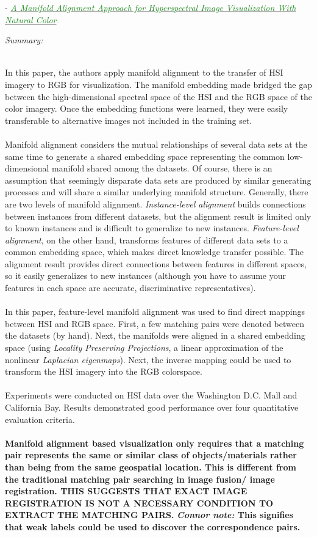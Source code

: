\documentclass[]{article}
\newcommand{\paperentry}[4]{
            \hangindent=1cm
            \textcolor{red}{\cite{#1}} - \href{run:../References/#3}{\textcolor{ForestGreen}{\textit{#2}}}
            
            \noindent            
            \begin{minipage}[t]{0.1\linewidth}\hfill\end{minipage}
            \begin{minipage}[t]{0.8\linewidth}\textcolor{NavyBlue}{{\textit{Summary:}}}#4\end{minipage}
            \vspace{.25cm}
          }
\begin{document}
				
		\paperentry{Liao2016ManAlignmentHSI}
		{A Manifold Alignment Approach for Hyperspectral Image Visualization With Natural Color}
		{Manifold_Representation_Learning/Alignment/Liao2016ManAlignmentHSI.pdf}
		{}\\
		In this paper, the authors apply manifold alignment to the transfer of HSI imagery to RGB for visualization.  The manifold embedding made bridged the gap between the high-dimensional spectral space of the HSI and the RGB space of the color imagery.  Once the embedding functions were learned, they were easily transferable to alternative images not included in the training set. 
		\\ \\
		Manifold alignment considers the mutual relationships of several data sets at the same time to generate a shared embedding space representing the common low-dimensional manifold shared among the datasets.  Of course, there is an assumption that seemingly disparate data sets are produced by similar generating processes and will share a similar underlying manifold structure.  Generally, there are two levels of manifold alignment.  \textit{Instance-level alignment} builds connections between instances from different datasets, but the alignment result is limited only to known instances and is difficult to generalize to new instances.  \textit{Feature-level alignment}, on the other hand, transforms features of different data sets to a common embedding space, which makes direct knowledge transfer possible.  The alignment result provides direct connections between features in different spaces, so it easily generalizes to new instances (although you have to assume your features in each space are accurate, discriminative representatives).
		\\ \\
		In this paper, feature-level manifold alignment was used to find direct mappings between HSI and RGB space.  First, a few matching pairs were denoted between the datasets (by hand).  Next, the manifolds were aligned in a shared embedding space (using \textit{Locality Preserving Projections}, a linear approximation of the nonlinear \textit{Laplacian eigenmaps}). Next, the inverse mapping could be used to transform the HSI imagery into the RGB colorspace. 
		\\ \\
		Experiments were conducted on HSI data over the Washington D.C. Mall and California Bay.  Results demonstrated good performance over four quantitative evaluation criteria.
		\\ \\
		\textbf{Manifold alignment based visualization only requires that a matching pair represents the same or similar class of objects/materials rather than being from the same geospatial location.  This is different from the traditional matching pair searching in image fusion/ image registration.  THIS SUGGESTS THAT EXACT IMAGE REGISTRATION IS NOT A NECESSARY CONDITION TO EXTRACT THE MATCHING PAIRS.}  \textbf{\textit{Connor note:} This signifies that weak labels could be used to discover the correspondence pairs.} \\
		
\end{document}
